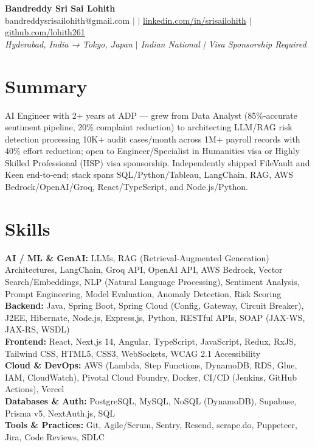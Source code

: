 \documentclass[10pt,letterpaper]{article}
\newcommand{\skillrow}[2]{\textbf{#1:} #2 \\[1pt]}
\begin{document}
\begin{center}
  {\Huge\bfseries Bandreddy Sri Sai Lohith}\\[3pt]
  \small bandreddysrisailohith@gmail.com $\vert$ $\vert$\; \href{https://linkedin.com/in/srisailohith}{linkedin.com/in/srisailohith} $\vert$\; \href{https://github.com/lohith261}{github.com/lohith261} \\[2pt]
  \small\textit{Hyderabad, India → Tokyo, Japan $\vert$\; Indian National | Visa Sponsorship Required}
\end{center}

\section{Summary}

AI Engineer with 2+ years at ADP --- grew from Data Analyst (85\%-accurate sentiment pipeline, 20\% complaint reduction) to architecting LLM/RAG risk detection processing 10K+ audit cases/month across 1M+ payroll records with 40\% effort reduction; open to Engineer/Specialist in Humanities visa or Highly Skilled Professional (HSP) visa sponsorship.
      Independently shipped FileVault and Keen end-to-end; stack spans SQL/Python/Tableau, LangChain, RAG, AWS Bedrock/OpenAI/Groq, React/TypeScript, and Node.js/Python.

\section{Skills}

\skillrow{AI / ML \& GenAI}{LLMs, RAG (Retrieval-Augmented Generation) Architectures, LangChain, Groq API, OpenAI API, AWS Bedrock, Vector Search/Embeddings, NLP (Natural Language Processing), Sentiment Analysis, Prompt Engineering, Model Evaluation, Anomaly Detection, Risk Scoring}
\skillrow{Backend}{Java, Spring Boot, Spring Cloud (Config, Gateway, Circuit Breaker), J2EE, Hibernate, Node.js, Express.js, Python, RESTful APIs, SOAP (JAX-WS, JAX-RS, WSDL)}
\skillrow{Frontend}{React, Next.js 14, Angular, TypeScript, JavaScript, Redux, RxJS, Tailwind CSS, HTML5, CSS3, WebSockets, WCAG 2.1 Accessibility}
\skillrow{Cloud \& DevOps}{AWS (Lambda, Step Functions, DynamoDB, RDS, Glue, IAM, CloudWatch), Pivotal Cloud Foundry, Docker, CI/CD (Jenkins, GitHub Actions), Vercel}
\skillrow{Databases \& Auth}{PostgreSQL, MySQL, NoSQL (DynamoDB), Supabase, Prisma v5, NextAuth.js, SQL}
\skillrow{Tools \& Practices}{Git, Agile/Scrum, Sentry, Resend, scrape.do, Puppeteer, Jira, Code Reviews, SDLC}
\end{document}
